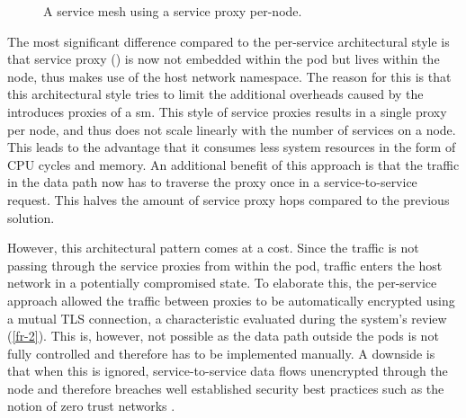 \begin{figure}[!t]
    \centering
    
    
    \caption{A service mesh using a service proxy per-node.}
    \label{fig:sm-arch-per-node}
\end{figure}

The most significant difference compared to the per-service architectural style is that service proxy () is now not embedded within the \gls{pod} but lives within the node, thus makes use of the host network namespace. The reason for this is that this architectural style tries to limit the additional overheads caused by the introduces proxies of a \gls{sm}. This style of service proxies results in a single proxy per node, and thus does not scale linearly with the number of services on a node. This leads to the advantage that it consumes less system resources in the form of CPU cycles and memory. An additional benefit of this approach is that the traffic in the data path now has to traverse the proxy once in a service-to-service request. This halves the amount of service proxy hops compared to the previous solution. 

However, this architectural pattern comes at a cost. Since the traffic is not passing through the service proxies from within the pod, traffic enters the host network in a potentially compromised state. To elaborate this, the per-service approach allowed the traffic between proxies to be automatically encrypted using a mutual TLS connection, a characteristic evaluated during the system's review (\ref{fr-2}). This is, however, not possible as the data path outside the \glspl{pod} is not fully controlled and therefore has to be implemented manually. A downside is that when this is ignored, service-to-service data flows unencrypted through the node and therefore breaches well established security best practices such as the notion of zero trust networks \cite{zero-trust-network}.




